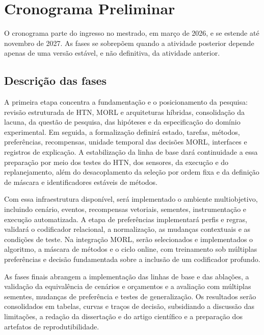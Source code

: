 \chapter{Cronograma Preliminar}

O cronograma parte do ingresso no mestrado, em março de 2026, e se estende até
novembro de 2027. As fases se sobrepõem quando a atividade posterior depende
apenas de uma versão estável, e não definitiva, da atividade anterior.

\section{Descrição das fases}

A primeira etapa concentra a fundamentação e o posicionamento da pesquisa:
revisão estruturada de HTN, MORL e arquiteturas híbridas, consolidação da
lacuna, da questão de pesquisa, das hipóteses e da especificação do domínio
experimental. Em seguida, a formalização definirá estado, tarefas, métodos,
preferências, recompensas, unidade temporal das decisões MORL, interfaces e
registros de explicação. A estabilização da linha de base dará continuidade a
essa preparação por meio dos testes do HTN, dos sensores, da execução e do
replanejamento, além do desacoplamento da seleção por ordem fixa e da definição
de máscara e identificadores estáveis de métodos.

Com essa infraestrutura disponível, será implementado o ambiente multiobjetivo,
incluindo cenário, eventos, recompensas vetoriais, sementes, instrumentação e
execução automatizada. A etapa de preferências implementará perfis e regras,
validará o codificador relacional, a normalização, as mudanças contextuais e as
condições de teste. Na integração MORL, serão selecionados e implementados o
algoritmo, a máscara de métodos e o ciclo online, com treinamento sob múltiplas
preferências e decisão fundamentada sobre a inclusão de um codificador profundo.

As fases finais abrangem a implementação das linhas de base e das ablações, a
validação da equivalência de cenários e orçamentos e a avaliação com múltiplas
sementes, mudanças de preferência e testes de generalização. Os resultados serão
consolidados em tabelas, curvas e traços de decisão, subsidiando a discussão das
limitações, a redação da dissertação e do artigo científico e a preparação dos
artefatos de reprodutibilidade.


